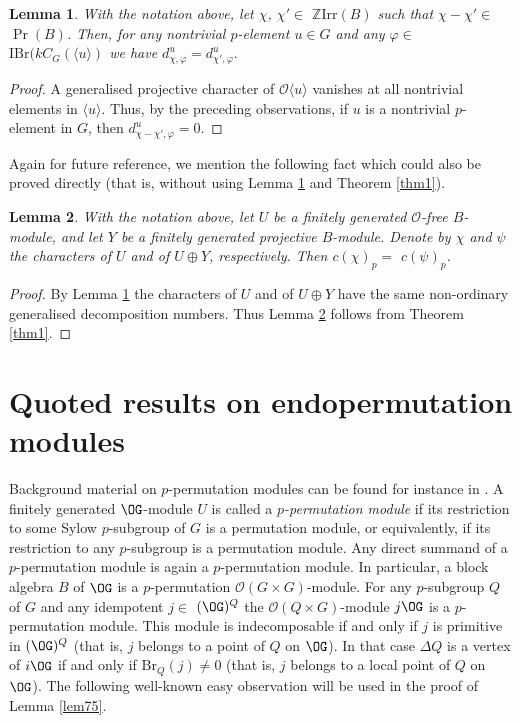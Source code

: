 \documentclass{amsart} %
\theoremstyle{plain}\newtheorem{Theorem}{Theorem}[section]
\theoremstyle{plain}\newtheorem{Conjecture}[Theorem]{Conjecture}
\theoremstyle{plain}\newtheorem{Corollary}[Theorem]{Corollary}
\theoremstyle{plain}\newtheorem{Lemma}[Theorem]{Lemma}
\theoremstyle{plain}\newtheorem{Proposition}[Theorem]{Proposition}
\theoremstyle{definition}\newtheorem{Definition}[Theorem]{Definition}
\theoremstyle{definition}\newtheorem{Example}[Theorem]{Example}
\theoremstyle{definition}\newtheorem{Examples}[Theorem]{Examples}
\theoremstyle{definition}\newtheorem{Remark}[Theorem]{Remark}
\theoremstyle{definition}\newtheorem{Remarks}[Theorem]{Remarks}
\theoremstyle{plain}\newtheorem{Statement}[Theorem]{}
\def\CO{{\mathcal{O}}}
\def\Z{{\mathbb Z}}
\def\Br{\mathrm{Br}}             \def\ten{\otimes}
\def\IBr{\mathrm{IBr}}
\def\Irr{\mathrm{Irr}}           \def\tenK{\otimes_K}
\begin{document}
\begin{Lemma} \label{lem1}
With the notation above, let $\chi$, $\chi'\in$ $\Z\Irr(B)$ such that $\chi-\chi'\in$
$\Pr(B)$. Then, for any nontrivial $p$-element $u\in G$ and any $\varphi\in$
$\IBr(kC_G(\langle u\rangle)$ we have 
$d^u_{\chi, \varphi} = d^u_{\chi',\varphi}.$
\end{Lemma}

\begin{proof}
A generalised projective character of $\CO\langle u\rangle$ vanishes at all
nontrivial elements in $\langle u\rangle$. Thus, by  the 
preceding observations, if $u$ is a nontrivial $p$-element in $G$,
then $d^u_{\chi-\chi',\varphi}=0$.
\end{proof}

Again for future reference, we mention the following fact which could also be
proved directly (that is, without using Lemma \ref{lem1} and Theorem \ref{thm1}).

\begin{Lemma} \label{lem2}
With the notation above, let $U$ be a finitely generated $\CO$-free
$B$-module, and let $Y$ be a finitely generated projective $B$-module.
Denote by $\chi$ and $\psi$ the characters of $U$ and of $U\oplus Y$,
respectively. 
Then $c(\chi)_p=$ $c(\psi)_p$.
\end{Lemma}

\begin{proof}
By Lemma \ref{lem1} the characters of $U$ and of $U\oplus Y$ have the same
non-ordinary generalised decomposition numbers. Thus Lemma \ref{lem2}
follows from Theorem \ref{thm1}.
\end{proof}





\section{Quoted results  on  endopermutation modules}


Background material on
$p$-permutation modules can be found for instance in \cite[Section 5.11]{LiBookI}.
A finitely generated $\OG$-module $U$ is called a {\em $p$-permutation module}
if its restriction to some  Sylow $p$-subgroup of $G$ is a permutation
module, or equivalently, if its restriction to any $p$-subgroup is a permutation
module. Any direct summand of a $p$-permutation module is again a 
$p$-permutation module. In particular, a block algebra $B$ of $\OG$ is
a $p$-permutation $\CO(G\times G)$-module. For any $p$-subgroup $Q$ of
$G$ and any idempotent $j\in$ $(\OG)^Q$ the $\CO(Q\times G)$-module
$j\OG$ is a $p$-permutation module. This module is indecomposable if and
only if $j$ is primitive in $(\OG)^Q$ (that is, $j$ belongs to a point of $Q$ on $\OG$).
In that case $\Delta Q$ is a vertex of $i\OG$ if and only if $\Br_Q(j)\neq 0$
(that is, $j$ belongs to a local point of $Q$ on $\OG$). The following 
well-known easy observation will be used in the proof of Lemma \ref{lem75}.
\end{document}
